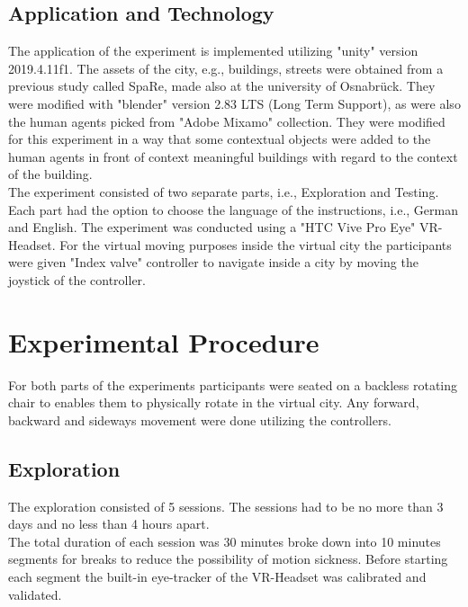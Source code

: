
\subsection{Application and Technology}

The application of the experiment is implemented utilizing "unity" version 2019.4.11f1. The assets of the city, e.g., buildings, streets were obtained from a previous study called SpaRe, made also at the university of Osnabrück. They were modified with "blender" version 2.83 LTS (Long Term Support), as were also the human agents picked from "Adobe Mixamo" collection. They were modified for this experiment in a way that some contextual objects were added to the human agents in front of context meaningful buildings with regard to the context of the building. \\
The experiment consisted of two separate parts, i.e., Exploration and Testing.  Each part had the option to choose the language of the instructions, i.e., German and English. The experiment was conducted using a "HTC Vive Pro Eye" VR-Headset. For the virtual moving purposes inside the virtual city the participants were given "Index valve" controller to navigate inside a city by moving the joystick of the controller. 

\section{Experimental Procedure}

For both parts of the experiments participants were seated on a backless rotating chair to enables them to physically rotate in the virtual city. Any forward, backward and sideways movement were done utilizing the controllers.

\subsection{Exploration}

The exploration consisted of 5 sessions. The sessions had to be no more than 3 days and no less than 4 hours apart. \\
The total duration of each session was 30 minutes broke down into 10 minutes segments for breaks to reduce the possibility of motion sickness. Before starting each segment the built-in eye-tracker of the VR-Headset was calibrated and validated. \\


